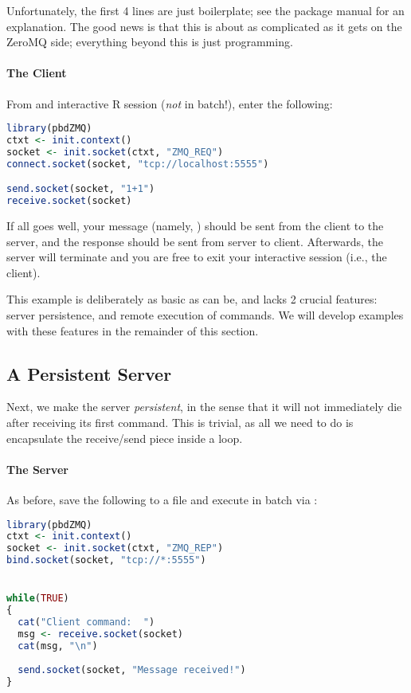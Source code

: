 Unfortunately, the first 4 lines are just boilerplate; see the package manual
for an explanation.  The good news is that this is about as complicated as
it gets on the ZeroMQ side; everything beyond this is just 
programming.

\paragraph{The Client}
From and interactive R session (\emph{not} in batch!), enter the
following:

\begin{lstlisting}[language=R,title=Client]
library(pbdZMQ)
ctxt <- init.context()
socket <- init.socket(ctxt, "ZMQ_REQ")
connect.socket(socket, "tcp://localhost:5555")

send.socket(socket, "1+1")
receive.socket(socket)
\end{lstlisting}

If all goes well, your message (namely, ) should be sent from the
client to the server, and the response  should be 
sent from server to client.  Afterwards, the server will terminate and you are
free to exit your interactive  session (i.e., the client).  

This example is deliberately as basic as can be, and lacks 2 crucial
features:  server persistence, and remote execution of commands.  We will
develop examples with these features in the remainder of this section.




\subsection{A Persistent Server}

Next, we make the server \emph{persistent}, in the sense that it will not
immediately die after receiving its first command.  This is trivial, as all
we need to do is encapsulate the receive/send piece inside a  loop.

\paragraph{The Server}
As before, save the following to a file and execute in batch via :

\begin{lstlisting}[language=R,title=Server]
library(pbdZMQ)
ctxt <- init.context()
socket <- init.socket(ctxt, "ZMQ_REP")
bind.socket(socket, "tcp://*:5555")


while(TRUE)
{
  cat("Client command:  ")
  msg <- receive.socket(socket)
  cat(msg, "\n")
  
  send.socket(socket, "Message received!")
}
\end{lstlisting}

